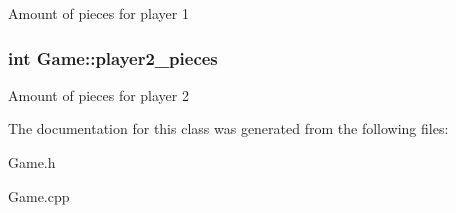 Amount of pieces for player 1 \hypertarget{class_game_a2b82ab082220d93bab2d7d1d181ad639}{
\subsubsection[{player2\-\_\-pieces}]{\setlength{\rightskip}{0pt plus 5cm}int Game\-::player2\-\_\-pieces\hspace{0.3cm}{\ttfamily [protected]}}}\label{class_game_a2b82ab082220d93bab2d7d1d181ad639}
Amount of pieces for player 2 

The documentation for this class was generated from the following files\-:\begin{DoxyCompactItemize}
\item 
Game.\-h\item 
Game.\-cpp\end{DoxyCompactItemize}

